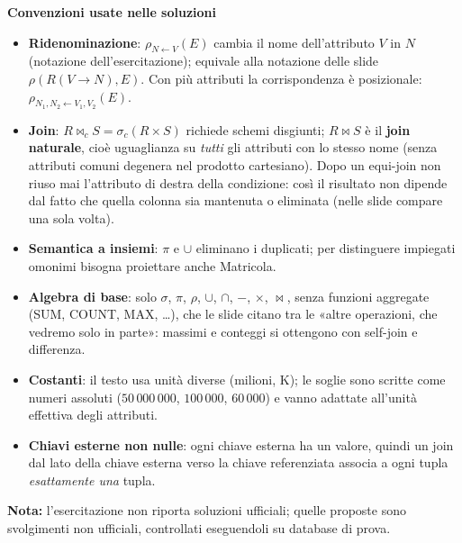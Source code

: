 \documentclass[12pt, a4paper]{article}
\begin{document}
\textbf{Convenzioni usate nelle soluzioni}
\begin{itemize}
\item \textbf{Ridenominazione}: $\rho_{N\leftarrow V}(E)$ cambia il nome dell'attributo $V$ in $N$ (notazione dell'esercitazione); equivale alla notazione delle slide $\rho(R(V\to N),E)$. Con più attributi la corrispondenza è posizionale: $\rho_{N_1,N_2\leftarrow V_1,V_2}(E)$.
\item \textbf{Join}: $R\bowtie_c S=\sigma_c(R\times S)$ richiede schemi disgiunti; $R\bowtie S$ è il \textbf{join naturale}, cioè uguaglianza su \emph{tutti} gli attributi con lo stesso nome (senza attributi comuni degenera nel prodotto cartesiano). Dopo un equi-join non riuso mai l'attributo di destra della condizione: così il risultato non dipende dal fatto che quella colonna sia mantenuta o eliminata (nelle slide compare una sola volta).
\item \textbf{Semantica a insiemi}: $\pi$ e $\cup$ eliminano i duplicati; per distinguere impiegati omonimi bisogna proiettare anche Matricola.
\item \textbf{Algebra di base}: solo $\sigma$, $\pi$, $\rho$, $\cup$, $\cap$, $-$, $\times$, $\bowtie$, senza funzioni aggregate (SUM, COUNT, MAX, \dots), che le slide citano tra le «altre operazioni, che vedremo solo in parte»: massimi e conteggi si ottengono con self-join e differenza.
\item \textbf{Costanti}: il testo usa unità diverse (milioni, K); le soglie sono scritte come numeri assoluti ($50\,000\,000$, $100\,000$, $60\,000$) e vanno adattate all'unità effettiva degli attributi.
\item \textbf{Chiavi esterne non nulle}: ogni chiave esterna ha un valore, quindi un join dal lato della chiave esterna verso la chiave referenziata associa a ogni tupla \emph{esattamente una} tupla.
\end{itemize}
\textbf{Nota:} l'esercitazione non riporta soluzioni ufficiali; quelle proposte sono svolgimenti non ufficiali, controllati eseguendoli su database di prova.
\end{document}
